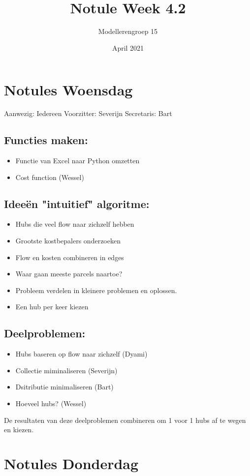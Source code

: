 \documentclass{article}
\title{Notule Week 4.2}
\author{Modelleren\itemB groep 15}
\date{April 2021}
\begin{document}
\section*{Notules Woensdag}
Aanwezig: Iedereen \newline
Voorzitter: Severijn \newline
Secretaris: Bart \newline
\subsection*{Functies maken:}
\begin{itemize}
    \item Functie van Excel naar Python omzetten
    \item Cost function (Wessel)
\end{itemize}

\subsection*{Ideeën "intuitief" algoritme:}
\begin{itemize}
    \item Hubs die veel flow naar zichzelf hebben
    \item Grootste kostbepalers onderzoeken
    \item Flow en kosten combineren in edges
    \item Waar gaan meeste parcels naartoe?
    \item Probleem verdelen in kleinere problemen en oplossen.
    \item Een hub per keer kiezen
\end{itemize}

\subsection*{Deelproblemen:}
\begin{itemize}
    \item Hubs baseren op flow naar zichzelf (Dyami)
    \item Collectie miminaliseren (Severijn)
    \item Dsitributie minimaliseren (Bart)
    \item Hoeveel hubs? (Wessel)
\end{itemize}

De resultaten van deze deelproblemen combineren om 1 voor 1 hubs af te wegen en kiezen.

\section*{Notules Donderdag}
\end{document}
